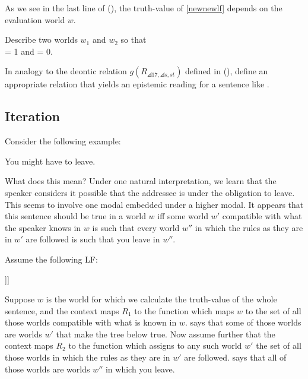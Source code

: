 As we see in the last line of (\lastx), the truth-value of \ref{newnewlf}
depends on the evaluation world $w$.
\begin{exercise}
	
	Describe two worlds $w_{1}$ and $w_{2}$ so that\\
	 = 1 and  = 0. \eex
\end{exercise}
\begin{exercise}
	
	In analogy to the deontic relation
  $g(R_{\angles{17,\angles{s,st}}})$ defined in (\lastx), define an
  appropriate relation that yields an epistemic reading for a sentence
  like . \eex
\end{exercise}

\subsection{Iteration}

Consider the following example: 

\ex You might have to leave. \xe

What does this mean? Under one natural interpretation, we learn that
the speaker considers it possible that the addressee is under the
obligation to leave. This seems to involve one modal embedded under a
higher modal. %
%
It appears that this sentence should be true in a world $w$ iff some
world $w'$ compatible with what the speaker knows in $w$ is such that
every world $w''$ in which the rules as they are in $w'$ are followed
is such that you leave in $w''$.

Assume the following LF:

\ex\null [I$'$ [ might $R_{\angles{1,\angles{s,st}}}$] [VP [ have-to
$R_{\angles{2,\angles{s,st}}}$] [IP you leave]]] \xe

Suppose $w$ is the world for which we calculate the truth-value of %
%
the whole sentence, and the context maps $R_1$ to the function which maps
$w$ to the set of all those worlds compatible with what is known in
$w$.  says that some of those worlds are worlds $w'$
that make the tree below  true. Now assume further
that the context maps $R_2$ to the function which assigns to any such
world $w'$ the set of all those worlds in which the rules as they are
in $w'$ are followed.  says that all of those
worlds are worlds $w''$ in which you leave.

